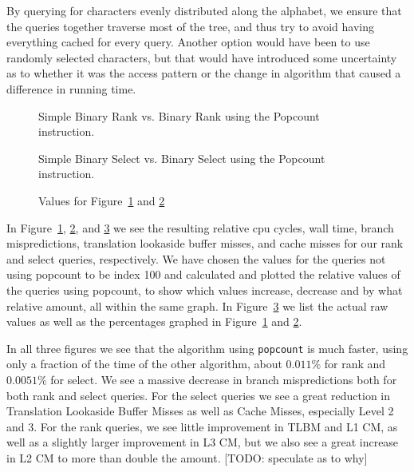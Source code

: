 By querying for characters evenly distributed along the alphabet, we ensure that the queries together traverse most of the tree, and thus try to avoid having everything cached for every query. Another option would have been to use randomly selected characters, but that would have introduced some uncertainty as to whether it was the access pattern or the change in algorithm that caused a difference in running time.



\begin{figure}
\caption{Simple Binary Rank vs. Binary Rank using the Popcount instruction.}
\label{fig:rankPopcountDiff}

\end{figure}

\begin{figure}
\caption{Simple Binary Select vs. Binary Select using the Popcount instruction.}
\label{fig:selectPopcountDiff}

\end{figure}

\begin{figure}
\center
\caption{Values for Figure~\ref{fig:rankPopcountDiff} and \ref{fig:selectPopcountDiff}}
\label{fig:valuesForPopcountDiff}

\end{figure}

In Figure~\ref{fig:rankPopcountDiff}, \ref{fig:selectPopcountDiff}, and \ref{fig:valuesForPopcountDiff} we see the resulting relative cpu cycles, wall time, branch mispredictions, translation lookaside buffer misses, and cache misses for our rank and select queries, respectively.
We have chosen the values for the queries not using popcount to be index 100 and calculated and plotted the relative values of the queries using popcount, to show which values increase, decrease and by what relative amount, all within the same graph.
In Figure~\ref{fig:valuesForPopcountDiff} we list the actual raw values as well as the percentages graphed in Figure~\ref{fig:rankPopcountDiff} and \ref{fig:selectPopcountDiff}.

In all three figures we see that the algorithm using \texttt{popcount} is much faster, using only a fraction of the time of the other algorithm, about $0.011\%$ for rank and $0.0051\%$ for select.
We see a massive decrease in branch mispredictions both for both rank and select queries. For the select queries we see a great reduction in Translation Lookaside Buffer Misses as well as Cache Misses, especially Level 2 and 3.
For the rank queries, we see little improvement in TLBM and L1 CM, as well as a slightly larger improvement in L3 CM, but we also see a great increase in L2 CM to more than double the amount.
[TODO: speculate as to why]


